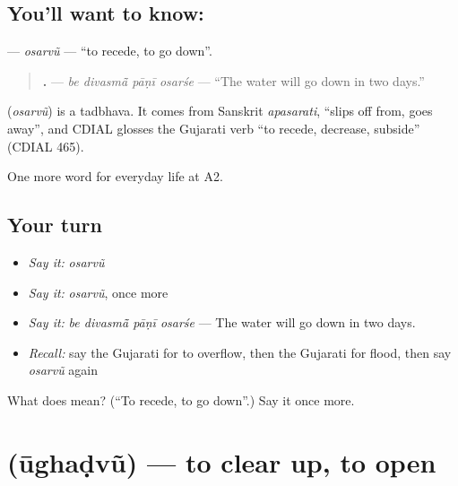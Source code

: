 \subsection*{You'll want to know: }
\textbf{} — \emph{osarvũ} — \textquotedblleft{}to recede, to go down\textquotedblright{}.

\begin{quote}
\textbf{   .} — \emph{be divasmā̃ pāṇī osarśe} — \textquotedblleft{}The water will go down in two days.\textquotedblright{}
\end{quote}

\begin{cousinweb}
\textbf{} (\emph{osarvũ}) is a tadbhava. It comes from Sanskrit \emph{apasarati}, \textquotedblleft{}slips off from, goes away\textquotedblright{}, and CDIAL glosses the Gujarati verb \textquotedblleft{}to recede, decrease, subside\textquotedblright{} (CDIAL 465).
\end{cousinweb}

\begin{grammarlens}[title={What you've built}]
One more word for everyday life at A2.
\end{grammarlens}

\subsection*{Your turn}
\begin{itemize}
\raggedright
  \item \emph{Say it:} \emph{osarvũ}
  \item \emph{Say it:} \emph{osarvũ}, once more
  \item \emph{Say it:} \emph{be divasmā̃ pāṇī osarśe} — The water will go down in two days.
  \item \emph{Recall:} say the Gujarati for to overflow, then the Gujarati for flood, then say \emph{osarvũ} again
\end{itemize}

\begin{tcolorbox}[breakable,colback=teal!4,colframe=teal!35!black,title={Before you move on}]
What does  mean? (\textquotedblleft{}To recede, to go down\textquotedblright{}.) Say it once more.
\end{tcolorbox}
\section[\texorpdfstring{\gu{ઊઘડવું} (ūghaḍvũ)}{ઊઘડવું (ūghaḍvũ)}]{ (ūghaḍvũ) — to clear up, to open}

